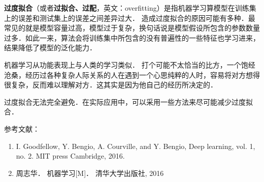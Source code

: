 
\textbf{过度拟合}（或者\textbf{过拟合、过配}，英文：overfitting）是指机器学习算模型在训练集上的误差和测试集上的误差之间差异过大．
造成过度拟合的原因可能有多种．最常见的就是模型容量过高，模型过于复杂，换句话说是模型假设所包含的参数数量过多．如此一来，算法会将训练集中所包含的没有普遍性的一些特征也学习进来，结果降低了模型的泛化能力．

机器学习从功能表现上与人类的学习类似．
打个可能不太恰当的比方，一个饱经沧桑，经历过各种复杂人际关系的人在遇到一个心思纯粹的人时，容易将对方想得很复杂，反而难以理解对方．这其实是因为他自己的经历所决定的．

过度拟合无法完全避免．在实际应用中，可以采用一些方法来尽可能减少过度拟合．



参考文献：
\begin{enumerate}
\item I. Goodfellow, Y. Bengio, A. Courville, and Y. Bengio, Deep learning, vol. 1, no. 2. MIT press Cambridge, 2016.
\item 周志华． 机器学习[M]． 清华大学出版社, 2016
\end{enumerate}